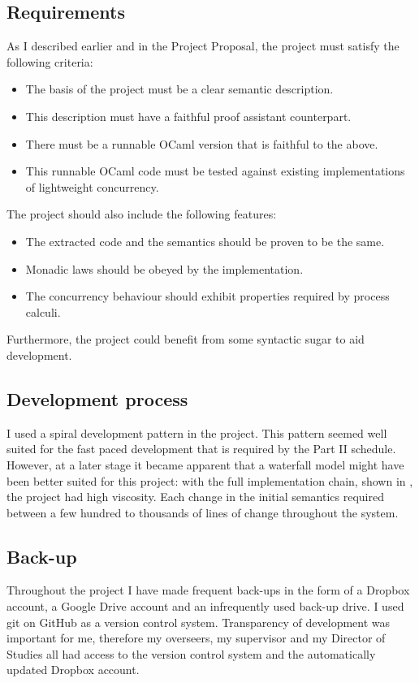\documentclass[12pt,twoside,notitlepage]{report}
\theoremstyle{plain}%
\theoremstyle{definition}
\theoremstyle{remark}
\begin{document}
\subsection{Requirements}
As I described earlier and in the Project Proposal, the project must satisfy the following criteria:
\begin{itemize}
\item{The basis of the project must be a clear semantic description.}
\item{This description must have a faithful proof assistant counterpart.}
\item{There must be a runnable OCaml version that is faithful to the above.}
\item{This runnable OCaml code must be tested against existing implementations of lightweight concurrency.}
\end{itemize}
The project should also include the following features:
\begin{itemize}
\item{The extracted code and the semantics should be proven to be the same.}
\item{Monadic laws should be obeyed by the implementation.}
\item{The concurrency behaviour should exhibit properties required by process calculi.}
\end{itemize}
Furthermore, the project could benefit from some syntactic sugar to aid development.

\subsection{Development process}
I used a spiral development pattern in the project. This pattern seemed well suited for the fast paced development that is required by the Part II schedule. However, at a later stage it became apparent that a waterfall model might have been better suited for this project: with the full implementation chain, shown in , the project had high viscosity. Each change in the initial semantics required between a few hundred to thousands of lines of change throughout the system. 
\subsection{Back-up}
Throughout the project I have made frequent back-ups in the form of a Dropbox account, a Google Drive account and an infrequently used back-up drive. I used git on GitHub as a version control system. Transparency of development was important for me, therefore my overseers, my supervisor and my Director of Studies all had access to the version control system and the automatically updated Dropbox account.
\end{document}
